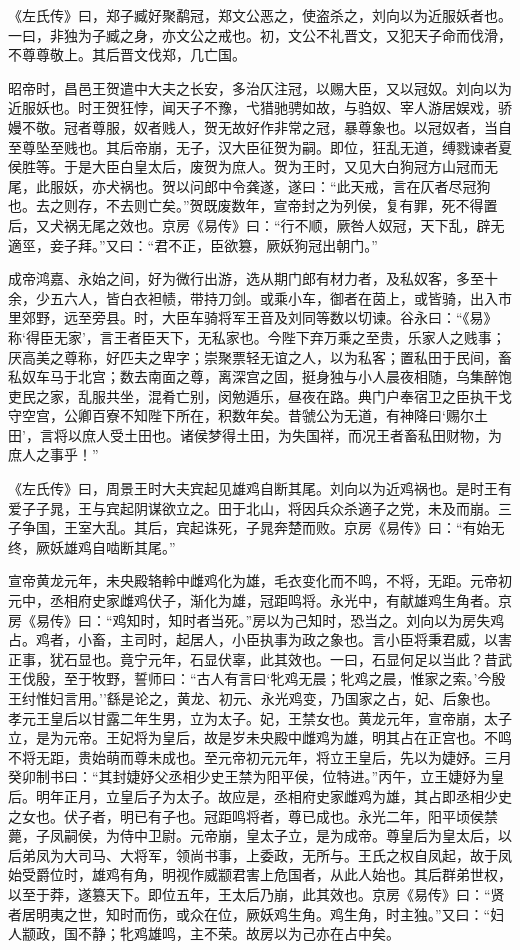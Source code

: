 \documentclass[]{article}
\begin{document}
《左氏传》曰，郑子臧好聚鹬冠，郑文公恶之，使盗杀之，刘向以为近服妖者也。一曰，非独为子臧之身，亦文公之戒也。初，文公不礼晋文，又犯天子命而伐滑，不尊尊敬上。其后晋文伐郑，几亡国。

昭帝时，昌邑王贺遣中大夫之长安，多治仄注冠，以赐大臣，又以冠奴。刘向以为近服妖也。时王贺狂悖，闻天子不豫，弋猎驰骋如故，与驺奴、宰人游居娱戏，骄嫚不敬。冠者尊服，奴者贱人，贺无故好作非常之冠，暴尊象也。以冠奴者，当自至尊坠至贱也。其后帝崩，无子，汉大臣征贺为嗣。即位，狂乱无道，缚戮谏者夏侯胜等。于是大臣白皇太后，废贺为庶人。贺为王时，又见大白狗冠方山冠而无尾，此服妖，亦犬祸也。贺以问郎中令龚遂，遂曰：``此天戒，言在仄者尽冠狗也。去之则存，不去则亡矣。''贺既废数年，宣帝封之为列侯，复有罪，死不得置后，又犬祸无尾之效也。京房《易传》曰：``行不顺，厥咎人奴冠，天下乱，辟无適巠，妾子拜。''又曰：``君不正，臣欲篡，厥妖狗冠出朝门。''

成帝鸿嘉、永始之间，好为微行出游，选从期门郎有材力者，及私奴客，多至十余，少五六人，皆白衣袒帻，带持刀剑。或乘小车，御者在茵上，或皆骑，出入市里郊野，远至旁县。时，大臣车骑将军王音及刘同等数以切谏。谷永曰：``《易》称`得臣无家'，言王者臣天下，无私家也。今陛下弃万乘之至贵，乐家人之贱事；厌高美之尊称，好匹夫之卑字；崇聚票轻无谊之人，以为私客；置私田于民间，畜私奴车马于北宫；数去南面之尊，离深宫之固，挺身独与小人晨夜相随，乌集醉饱吏民之家，乱服共坐，混肴亡别，闵勉遁乐，昼夜在路。典门户奉宿卫之臣执干戈守空宫，公卿百寮不知陛下所在，积数年矣。昔虢公为无道，有神降曰`赐尔土田'，言将以庶人受土田也。诸侯梦得土田，为失国祥，而况王者畜私田财物，为庶人之事乎！''

《左氏传》曰，周景王时大夫宾起见雄鸡自断其尾。刘向以为近鸡祸也。是时王有爱子子晁，王与宾起阴谋欲立之。田于北山，将因兵众杀適子之党，未及而崩。三子争国，王室大乱。其后，宾起诛死，子晁奔楚而败。京房《易传》曰：``有始无终，厥妖雄鸡自啮断其尾。''

宣帝黄龙元年，未央殿辂軨中雌鸡化为雄，毛衣变化而不鸣，不将，无距。元帝初元中，丞相府史家雌鸡伏子，渐化为雄，冠距鸣将。永光中，有献雄鸡生角者。京房《易传》曰：``鸡知时，知时者当死。''房以为己知时，恐当之。刘向以为房失鸡占。鸡者，小畜，主司时，起居人，小臣执事为政之象也。言小臣将秉君威，以害正事，犹石显也。竟宁元年，石显伏辜，此其效也。一曰，石显何足以当此？昔武王伐殷，至于牧野，誓师曰：``古人有言曰`牝鸡无晨；牝鸡之晨，惟家之索。'今殷王纣惟妇言用。''繇是论之，黄龙、初元、永光鸡变，乃国家之占，妃、后象也。孝元王皇后以甘露二年生男，立为太子。妃，王禁女也。黄龙元年，宣帝崩，太子立，是为元帝。王妃将为皇后，故是岁未央殿中雌鸡为雄，明其占在正宫也。不鸣不将无距，贵始萌而尊未成也。至元帝初元元年，将立王皇后，先以为婕妤。三月癸卯制书曰：``其封婕妤父丞相少史王禁为阳平侯，位特进。''丙午，立王婕妤为皇后。明年正月，立皇后子为太子。故应是，丞相府史家雌鸡为雄，其占即丞相少史之女也。伏子者，明已有子也。冠距鸣将者，尊已成也。永光二年，阳平顷侯禁薨，子凤嗣侯，为侍中卫尉。元帝崩，皇太子立，是为成帝。尊皇后为皇太后，以后弟凤为大司马、大将军，领尚书事，上委政，无所与。王氏之权自凤起，故于凤始受爵位时，雄鸡有角，明视作威颛君害上危国者，从此人始也。其后群弟世权，以至于莽，遂篡天下。即位五年，王太后乃崩，此其效也。京房《易传》曰：``贤者居明夷之世，知时而伤，或众在位，厥妖鸡生角。鸡生角，时主独。''又曰：``妇人颛政，国不静；牝鸡雄鸣，主不荣。故房以为己亦在占中矣。
\end{document}
